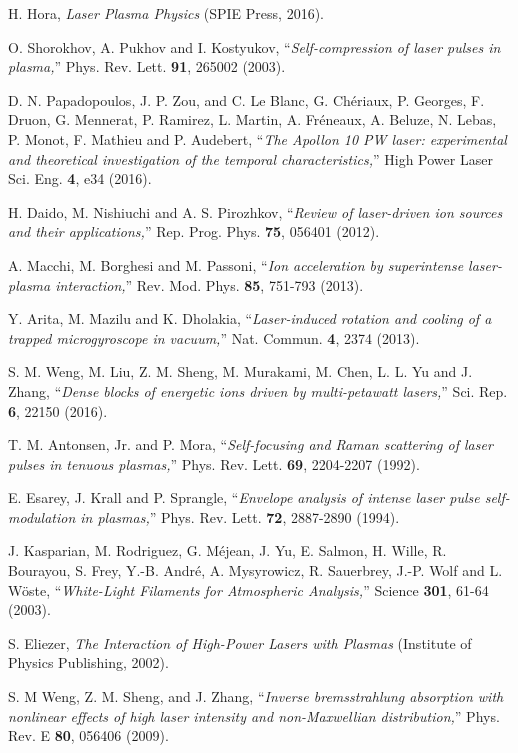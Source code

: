 \documentclass[%
aps,
preprint,
showpacs,
preprintnumbers,
 amsmath,
 amssymb,
 prl,
]{revtex4-1}
\begin{document}
\begin{thebibliography}{9}
 H. Hora, \emph{Laser Plasma Physics} (SPIE Press, 2016).

 O. Shorokhov, A. Pukhov and I. Kostyukov, ``\emph{Self-compression of laser pulses in plasma,}'' Phys. Rev. Lett. \textbf{91}, 265002 (2003).

 D. N. Papadopoulos, J. P. Zou, and C. Le Blanc, G. Ch\'{e}riaux, P. Georges, F. Druon, G. Mennerat, P. Ramirez, L. Martin, A. Fr\'{e}neaux, A. Beluze, N. Lebas, P. Monot, F. Mathieu and P. Audebert, ``\emph{The Apollon 10 PW laser: experimental and theoretical investigation of the temporal characteristics,}'' High Power Laser Sci. Eng. \textbf{4}, e34 (2016).

 H. Daido, M. Nishiuchi and A. S. Pirozhkov, ``\emph{Review of laser-driven ion sources and their applications,}'' Rep. Prog. Phys. \textbf{75}, 056401 (2012).

 A. Macchi, M. Borghesi and M. Passoni, ``\emph{Ion acceleration by superintense laser-plasma interaction,}'' Rev. Mod. Phys. \textbf{85}, 751-793 (2013).

 Y. Arita, M. Mazilu and K. Dholakia, ``\emph{Laser-induced rotation and cooling of a trapped microgyroscope in vacuum,}'' Nat. Commun. \textbf{4}, 2374 (2013).

 S. M. Weng, M. Liu, Z. M. Sheng, M. Murakami, M. Chen, L. L. Yu and J. Zhang, ``\emph{Dense blocks of energetic ions driven by multi-petawatt lasers,}'' Sci. Rep. \textbf{6}, 22150 (2016).

 T. M. Antonsen, Jr. and P. Mora, ``\emph{Self-focusing and Raman scattering of laser pulses in tenuous plasmas,}'' Phys. Rev. Lett. \textbf{69}, 2204-2207 (1992).

 E. Esarey, J. Krall and P. Sprangle, ``\emph{Envelope analysis of intense laser pulse self-modulation in plasmas,}'' Phys. Rev. Lett. \textbf{72}, 2887-2890 (1994).

 J. Kasparian, M. Rodriguez, G. M{\'e}jean, J. Yu, E. Salmon, H. Wille, R. Bourayou, S. Frey, Y.-B. Andr{\'e}, A. Mysyrowicz, R. Sauerbrey, J.-P. Wolf and L. W{\"o}ste, ``\emph{White-Light Filaments for Atmospheric Analysis,}'' Science \textbf{301}, 61-64 (2003).

 S. Eliezer, \emph{The Interaction of High-Power Lasers with Plasmas} (Institute of Physics Publishing, 2002).

 S. M Weng, Z. M. Sheng, and J. Zhang, ``\emph{Inverse bremsstrahlung absorption with nonlinear effects of high laser intensity and non-Maxwellian distribution,}'' Phys. Rev. E \textbf{80}, 056406 (2009).


\end{thebibliography}
\end{document}
